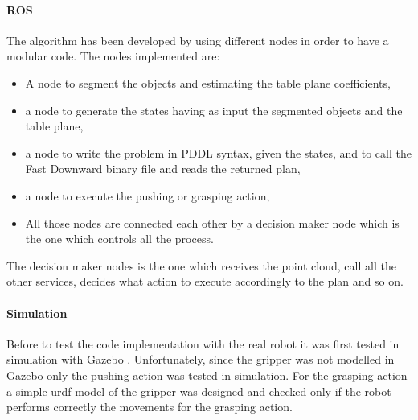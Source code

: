 \paragraph{ROS}
The algorithm has been developed by using different nodes in order to have a modular code. 
The nodes implemented are:
\begin{itemize}
\item A node to segment the objects and estimating the table plane coefficients,
\item a node to generate the states having as input the segmented objects and the table plane,
\item a node  to write the problem in PDDL syntax, given the states, and to call the Fast Downward binary file and reads the returned plan, 
\item a node to execute the pushing or grasping action,
\item All those nodes are connected each other by a decision maker node which is the one which controls all the process.  
\end{itemize}
The decision maker nodes is the one which receives the point cloud, call all the other services, decides what action to execute accordingly to the plan and so on. 

\paragraph{Simulation}
Before to test the code implementation with the real robot it was first tested in simulation with Gazebo \citep{koenig2004design}. Unfortunately, since the gripper was not modelled in Gazebo only the pushing action was tested in simulation. For the grasping action a simple urdf model of the gripper was designed and checked only if the robot performs correctly the movements for the grasping action.  